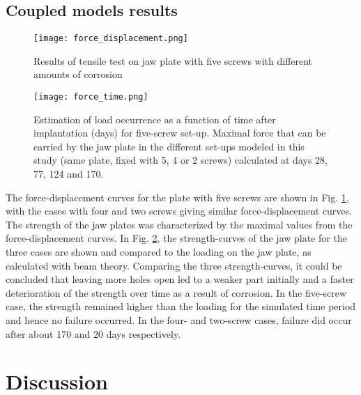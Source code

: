 
\subsection{Coupled models results}

\begin{figure}[h]
    \centering
    \medskip
    \texttt{[image: force\_displacement.png]}
    \caption{Results of tensile test on jaw plate with five screws with different amounts of corrosion}
    \label{fig:forcedisp}
\end{figure}

\begin{figure}[h]
    \centering
    \medskip
    \texttt{[image: force\_time.png]}
    \caption[Estimation of load occurrence as a function of time after implantation for five-screw set-up]{Estimation of load occurrence as a function of time after implantation (days) for five-screw set-up. Maximal force that can be carried by the jaw plate in the different set-ups modeled in this study (same plate, fixed with 5, 4 or 2 screws) calculated at days 28, 77, 124 and 170.}
    \label{fig:forcetime}
\end{figure}

The force-displacement curves for the plate with five screws are shown in Fig. \ref{fig:forcedisp}, with the cases with four and two screws giving similar force-displacement curves. The strength of the jaw plates was characterized by the maximal values from the force-displacement curves. In Fig. \ref{fig:forcetime}, the strength-curves of the jaw plate for the three cases are shown and compared to the loading on the jaw plate, as calculated with beam theory. Comparing the three strength-curves, it could be concluded that leaving more holes open led to a weaker part initially and a faster deterioration of the strength over time as a result of corrosion. In the five-screw case, the strength remained higher than the loading for the simulated time period and hence no failure occurred. In the four- and two-screw cases, failure did occur after about 170 and 20 days respectively.


\section{Discussion}

